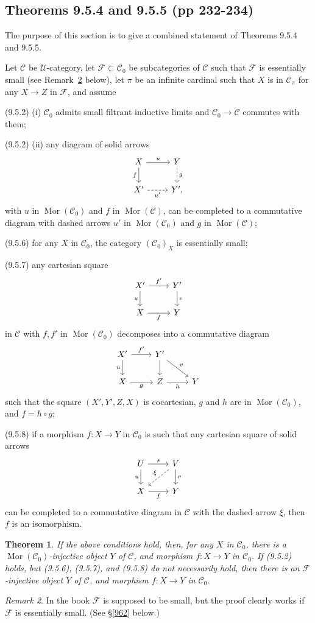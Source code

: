 \documentclass[12pt]{article}%
\newtheorem{thm}{Theorem}%
\theoremstyle{remark}
\newtheorem{rk}[thm]{Remark}
\theoremstyle{definition}
\newcommand{\nn}{\noindent}
\newcommand{\cc}{\mathcal}
\newcommand{\C}{\mathcal C}
\newcommand{\F}{\mathcal F}
\newcommand{\U}{\mathcal U}
\DeclareMathOperator{\Mor}{Mor}
\begin{document}

\subsection{Theorems 9.5.4 and 9.5.5 (pp 232-234)}\label{954955}

The purpose of this section is to give a combined statement of Theorems 9.5.4 and 9.5.5. 

Let $\C$ be $\U$-category, let $\cc F\subset\C_0$ be subcategories of $\C$ such that $\cc F$ is essentially small (see Remark~\ref{954} below), let $\pi$ be an infinite cardinal such that $X$ is in $\C_\pi$ for any $X\to Z$ in $\cc F$, and assume 

\nn(9.5.2) (i) $\C_0$ admits small filtrant inductive limits and $\C_0\to\C$ commutes with them;

\nn(9.5.2) (ii) any diagram of solid arrows
$$
\begin{tikzcd}
X\ar{d}[swap]{f}\ar{r}{u}&Y\ar[dashed]{d}{g}\\ 
X'\ar[dashed]{r}[swap]{u'}&Y',
\end{tikzcd}
$$ 
with $u$ in $\Mor(\C_0)$ and $f$ in $\Mor(\C)$, can be completed to a commutative diagram with dashed arrows $u'$ in $\Mor(\C_0)$ and $g$ in $\Mor(\C)$; 

\nn(9.5.6) for any $X$ in $\C_0$, the category $(\C_0)_X$ is essentially small;

\nn(9.5.7) any cartesian square 
$$
\begin{tikzcd}
X'\ar{d}[swap]{u}\ar{r}{f'}&Y'\ar{d}{v}\\ 
X\ar{r}[swap]{f}&Y
\end{tikzcd}
$$ 
in $\C$ with $f,f'$ in $\Mor(\C_0)$ decomposes into a commutative diagram 
$$
\begin{tikzcd}
X'\ar{d}[swap]{u}\ar{r}{f'}&Y'\ar{d}\ar{rd}{v}\\ 
X\ar{r}[swap]{g}&Z\ar{r}[swap]{h}&Y
\end{tikzcd}
$$ 
such that the square $(X',Y',Z,X)$ is cocartesian, $g$ and $h$ are in $\Mor(\C_0)$, and $f=h\circ g$; 

\nn(9.5.8) if a morphism $f:X\to Y$ in $\C_0$ is such that any cartesian square of solid arrows
$$
\begin{tikzcd}
U\ar{d}[swap]{u}\ar{r}{s}&V\ar{d}{v}\ar[dashed]{ld}[swap]{\xi}\\ 
X\ar{r}[swap]{f}&Y
\end{tikzcd}
$$ 
can be completed to a commutative diagram in $\C$ with the dashed arrow $\xi$, then $f$ is an isomorphism. 
%
\begin{thm}%
If the above conditions hold, then, for any $X$ in $\C_0$, there is a $\Mor(\C_0)$-injective object $Y$ of $\C$, and morphism $f:X\to Y$ in $\C_0$. If (9.5.2) holds, but (9.5.6), (9.5.7), and (9.5.8) do not necessarily hold, then there is an $\F$-injective object $Y$ of $\C$, and morphism $f:X\to Y$ in $\C_0$.
\end{thm}
%
\begin{rk}\label{954}
In the book $\cc F$ is supposed to be small, but the proof clearly works if $\cc F$ is essentially small. (See \S\ref{962} below.)
\end{rk}
\end{document}
